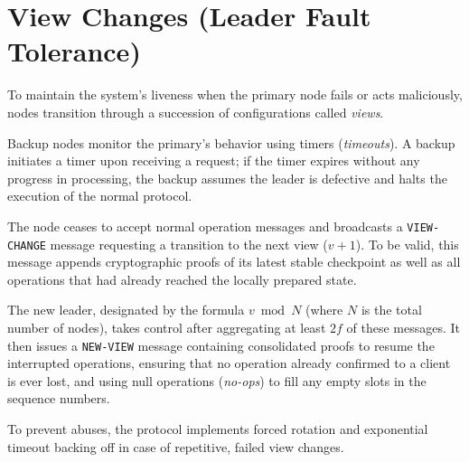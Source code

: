 \section{View Changes (Leader Fault Tolerance)}
To maintain the system's liveness when the primary node fails or acts maliciously, nodes transition through a succession of configurations called \textit{views}.

Backup nodes monitor the primary's behavior using timers (\textit{timeouts}). A backup initiates a timer upon receiving a request; if the timer expires without any progress in processing, the backup assumes the leader is defective and halts the execution of the normal protocol.

The node ceases to accept normal operation messages and broadcasts a \texttt{VIEW-CHANGE} message requesting a transition to the next view ($v+1$). To be valid, this message appends cryptographic proofs of its latest stable checkpoint as well as all operations that had already reached the locally prepared state.

The new leader, designated by the formula $v \bmod N$ (where $N$ is the total number of nodes), takes control after aggregating at least $2f$ of these messages. It then issues a \texttt{NEW-VIEW} message containing consolidated proofs to resume the interrupted operations, ensuring that no operation already confirmed to a client is ever lost, and using null operations (\textit{no-ops}) to fill any empty slots in the sequence numbers. 

To prevent abuses, the protocol implements forced rotation and exponential timeout backing off in case of repetitive, failed view changes.
